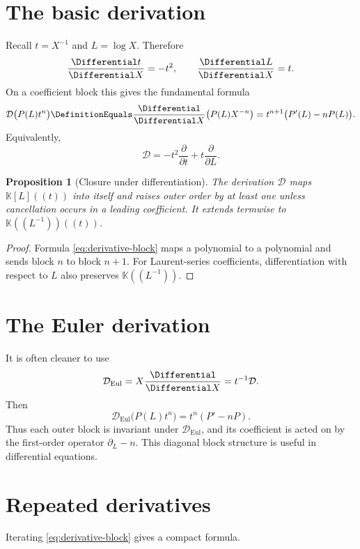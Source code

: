 \documentclass[11pt,oneside]{book}
\newtheorem{proposition}[theorem]{Proposition}
\theoremstyle{definition}
\theoremstyle{remark}
\newcommand{\K}{\mathbb K}
\newcommand{\D}{\mathcal D}
\newcommand{\EulerDerivation}{\mathcal D_{\mathrm{Eul}}}
\begin{document}
\section{The basic derivation}
Recall $t=X^{-1}$ and $L=\log X$.  Therefore
\[
 \frac{\Differential t}{\Differential X}=-t^2,
 \qquad
 \frac{\Differential L}{\Differential X}=t.
\]
On a coefficient block this gives the fundamental formula
\begin{equation}\label{eq:derivative-block}
 \D\bigl(P(L)t^n\bigr)
 \DefinitionEquals\frac{\Differential}{\Differential X}\bigl(P(L)X^{-n}\bigr)
 =t^{n+1}\bigl(P'(L)-nP(L)\bigr).
\end{equation}
Equivalently,
\begin{equation}\label{eq:derivation-operator}
 \D=-t^2\frac{\partial}{\partial t}
     +t\frac{\partial}{\partial L}.
\end{equation}

\begin{proposition}[Closure under differentiation]
The derivation $\D$ maps $\K[L]((t))$ into itself and raises outer order by at
least one unless cancellation occurs in a leading coefficient.  It extends
termwise to $\K((L^{-1}))((t))$.
\end{proposition}
\begin{proof}
Formula \eqref{eq:derivative-block} maps a polynomial to a polynomial and
sends block $n$ to block $n+1$.  For Laurent-series coefficients,
differentiation with respect to $L$ also preserves $\K((L^{-1}))$.
\end{proof}

\section{The Euler derivation}
It is often cleaner to use
\begin{equation}\label{eq:euler-derivation}
 \EulerDerivation=X\frac{\Differential}{\Differential X}=t^{-1}\D.
\end{equation}
Then
\begin{equation}\label{eq:euler-block}
 \EulerDerivation\bigl(P(L)t^n\bigr)=t^n(P'-nP).
\end{equation}
Thus each outer block is invariant under $\EulerDerivation$, and its coefficient is
acted on by the first-order operator $\partial_L-n$.  This diagonal block
structure is useful in differential equations.

\section{Repeated derivatives}
Iterating \eqref{eq:derivative-block} gives a compact formula.
\end{document}
